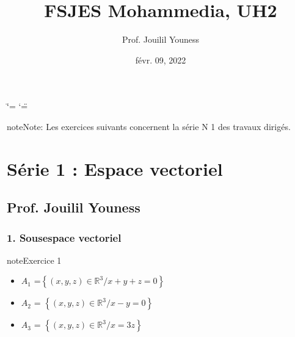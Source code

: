 \documentclass[letterpaper,10pt,french]{jupyterBook}
\title{FSJES Mohammedia, UH2}
\date{févr. 09, 2022}
\author{Prof.\@{} Jouilil Youness}
\begin{document}
\ifdefined\shorthandoff
  \ifnum\catcode`\=\string=\active\shorthandoff{=}\fi
  \ifnum\catcode`\"=\active{}\fi
\fi

\pagestyle{empty}
\sphinxmaketitle
\pagestyle{plain}
\sphinxtableofcontents
\pagestyle{normal}
\label{\detokenize{intro::doc}}


\begin{sphinxadmonition}{note}{Note:}
\sphinxAtStartPar
Les exercices suivants concernent la série N 1 des travaux dirigés.
\end{sphinxadmonition}


\chapter{Série 1 : Espace vectoriel}
\label{\detokenize{S_xe9rie1:serie-1-espace-vectoriel}}\label{\detokenize{S_xe9rie1::doc}}

\section{Prof. Jouilil Youness}
\label{\detokenize{S_xe9rie1:prof-jouilil-youness}}

\subsection{1. Sous\sphinxhyphen{}espace vectoriel}
\label{\detokenize{S_xe9rie1:sous-espace-vectoriel}}
\begin{sphinxadmonition}{note}{Exercice 1}

\sphinxAtStartPar
{}
\begin{itemize}
\item {} 
\sphinxAtStartPar
\(A_1\) =\( \left\{ (x,y,z) \in \mathbb{R}^3 / x+y+z = 0 \right\}\)

\item {} 
\sphinxAtStartPar
\(A_2\) = \( \left\{ (x,y,z) \in \mathbb{R}^3 / x-y = 0 \right\}\)

\item {} 
\sphinxAtStartPar
\(A_3\) = \( \left\{ (x,y,z) \in \mathbb{R}^3 / x =3z \right\}\)

\end{itemize}
\end{sphinxadmonition}
\end{document}
